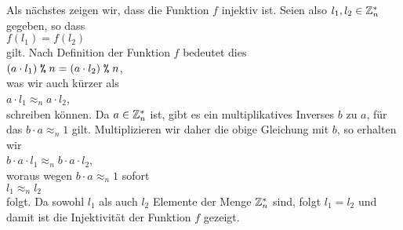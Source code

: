 Als nächstes zeigen wir, dass die Funktion $f$ injektiv ist.  Seien also $l_1, l_2 \in \mathbb{Z}_{n}^*$
gegeben, so dass
\\[0.2cm]
\hspace*{1.3cm}
$f(l_1) = f(l_2)$
\\[0.2cm]
gilt.  Nach Definition der Funktion $f$ bedeutet dies
\\[0.2cm]
\hspace*{1.3cm}
$(a \cdot l_1) \;\texttt{\%}\; n = (a \cdot l_2) \;\texttt{\%}\; n$, 
\\[0.2cm]
was wir auch kürzer als
\\[0.2cm]
\hspace*{1.3cm}
$a \cdot l_1 \approx_n a \cdot l_2$, 
\\[0.2cm]
schreiben können.  Da $a \in \mathbb{Z}_{n}^*$ ist, gibt es ein multiplikatives Inverses $b$ zu $a$, für das
$b \cdot a \approx_n 1$ gilt.  Multiplizieren wir daher die obige Gleichung mit $b$, so erhalten wir
\\[0.2cm]
\hspace*{1.3cm}
$b \cdot a \cdot l_1 \approx_n b \cdot a \cdot l_2$, 
\\[0.2cm] 
woraus wegen $b \cdot a \approx_n 1$ sofort
\\[0.2cm]
\hspace*{1.3cm}
$l_1 \approx_n l_2$ 
\\[0.2cm]
folgt.  Da sowohl $l_1$ als auch $l_2$ Elemente der Menge $\mathbb{Z}_{n}^*$ sind, folgt $l_1 = l_2$ und
damit ist die Injektivität der Funktion $f$ gezeigt.
\vspace*{0.3cm}


